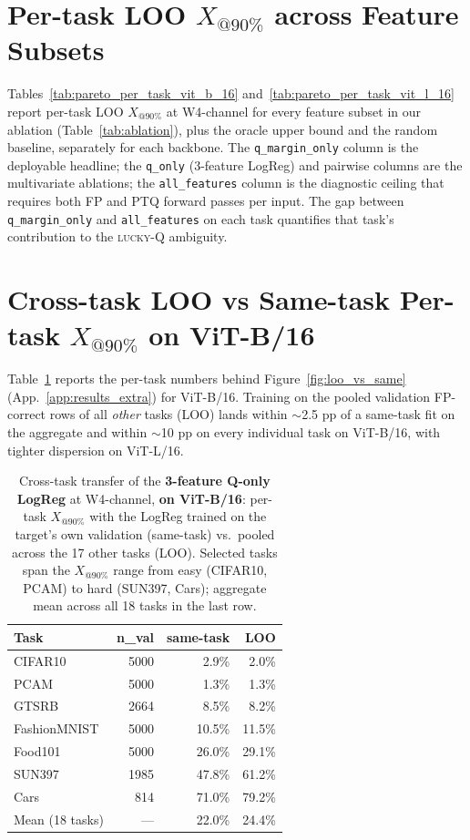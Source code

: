 \documentclass{article}
\makeatletter
\newcommand{\fp}{\textsc{FP}\xspace}
\newcommand{\ptq}{\textsc{PTQ}\xspace}
\newcommand{\luckyq}{\textsc{lucky-Q}\xspace}
\newcommand{\xat}[1]{\ensuremath{X_{@#1\%}}}
\makeatother
\begin{document}
\section{Per-task LOO \xat{90} across Feature Subsets}\label{app:per-task}

Tables~\ref{tab:pareto_per_task_vit_b_16} and~\ref{tab:pareto_per_task_vit_l_16} report per-task LOO $X_{@90\%}$ at W4-channel for every feature subset in our ablation (Table~\ref{tab:ablation}), plus the oracle upper bound and the random baseline, separately for each backbone. The \texttt{q\_margin\_only} column is the deployable headline; the \texttt{q\_only} (3-feature LogReg) and pairwise columns are the multivariate ablations; the \texttt{all\_features} column is the diagnostic ceiling that requires both \fp{} and \ptq{} forward passes per input. The gap between \texttt{q\_margin\_only} and \texttt{all\_features} on each task quantifies that task's contribution to the \luckyq{} ambiguity.




\section{Cross-task LOO vs Same-task Per-task \xat{90} on ViT-B/16}\label{app:loo_per_task}

Table~\ref{tab:loo} reports the per-task numbers behind Figure~\ref{fig:loo_vs_same} (App.~\ref{app:results_extra}) for ViT-B/16. Training on the pooled validation \fp{}-correct rows of all \emph{other} tasks (LOO) lands within $\sim$2.5 pp of a same-task fit on the aggregate and within $\sim$10 pp on every individual task on ViT-B/16, with tighter dispersion on ViT-L/16.

\begin{table}[t]
\centering
\caption{Cross-task transfer of the \textbf{3-feature Q-only LogReg} at W4-channel, \textbf{on ViT-B/16}: per-task \xat{90} with the LogReg trained on the target's own validation (same-task) vs.\ pooled across the 17 other tasks (LOO). Selected tasks span the \xat{90} range from easy (CIFAR10, PCAM) to hard (SUN397, Cars); aggregate mean across all 18 tasks in the last row.}
\label{tab:loo}
\small
\begin{tabular}{lrrr}
\toprule
Task & n\_val & same-task & LOO \\
\midrule
CIFAR10       & 5000 & 2.9\%  & 2.0\%  \\
PCAM          & 5000 & 1.3\%  & 1.3\%  \\
GTSRB         & 2664 & 8.5\%  & 8.2\%  \\
FashionMNIST  & 5000 & 10.5\% & 11.5\% \\
Food101       & 5000 & 26.0\% & 29.1\% \\
SUN397        & 1985 & 47.8\% & 61.2\% \\
Cars          & 814  & 71.0\% & 79.2\% \\
\midrule
Mean (18 tasks) & --- & 22.0\% & 24.4\% \\
\bottomrule
\end{tabular}
\end{table}
\end{document}
